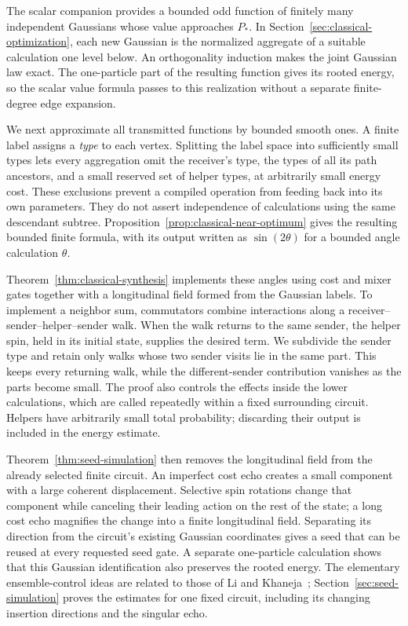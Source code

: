 The scalar companion provides a bounded odd function of finitely
many independent Gaussians whose value approaches $P_*$. In
Section~\ref{sec:classical-optimization}, each new Gaussian is the
normalized aggregate of a suitable calculation one level below.
An orthogonality induction makes the joint Gaussian law exact.
The one-particle part of the resulting function gives its rooted
energy, so the scalar value formula passes to this realization
without a separate finite-degree edge expansion.

We next approximate all transmitted functions by bounded smooth
ones. A finite label assigns a \emph{type} to each vertex. Splitting
the label space into sufficiently small types lets every
aggregation omit the receiver's type, the types of all its path
ancestors, and a small reserved set of helper types, at arbitrarily
small energy cost. These exclusions prevent a compiled operation
from feeding back into its own parameters. They do not assert
independence of calculations using the same descendant subtree.
Proposition~\ref{prop:classical-near-optimum} gives the resulting
bounded finite formula, with its output written as $\sin(2\theta)$
for a bounded angle calculation $\theta$.

Theorem~\ref{thm:classical-synthesis} implements these angles using
cost and mixer gates together with a longitudinal field formed from
the Gaussian labels. To implement a neighbor sum, commutators combine
interactions along a receiver--sender--helper--sender walk. When the
walk returns to the same sender, the helper spin, held in its initial
state, supplies the desired term. We subdivide the sender type and
retain only walks whose two sender visits lie in the same part. This
keeps every returning walk, while the different-sender contribution
vanishes as the parts become small. The proof also controls the effects inside
the lower calculations, which are called repeatedly within a fixed
surrounding circuit. Helpers have arbitrarily small total probability;
discarding their output is included in the energy estimate.

Theorem~\ref{thm:seed-simulation} then removes the longitudinal
field from the already selected finite circuit. An imperfect cost echo
creates a small component with a large coherent displacement. Selective
spin rotations change that component while canceling their leading
action on the rest of the state; a long cost echo magnifies the change
into a finite longitudinal field. Separating its direction from the
circuit's existing Gaussian coordinates gives a seed that can be reused
at every requested seed gate. A separate one-particle calculation shows
that this Gaussian identification also preserves the rooted energy.
The elementary ensemble-control ideas are related to those of Li and
Khaneja~\cite{LiKhaneja2005}; Section~\ref{sec:seed-simulation}
proves the estimates for one fixed circuit, including its changing
insertion directions and the singular echo.

